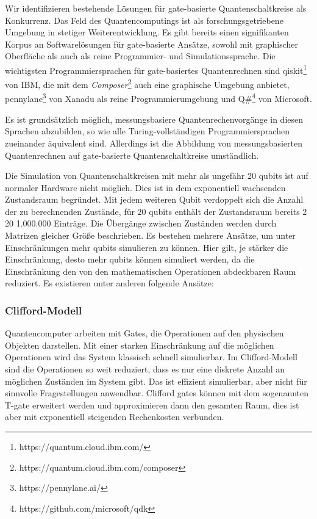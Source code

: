 \documentclass[11pt, a4paper]{article}
\newcommand{\instruction}[1]{{}}
\begin{document}
\instruction{quantitative Gegenüberstellung konkurrierender Lösungen}

\instruction{bisherige Arbeiten der Partner mit Bezug zu den Zielen
  dieses Vorhabens}

\instruction{Beschreibung bestehender und konkurrierender
  Technologien. Benennung eines konkreten Anwendungsfalls, bei dem
  aktuelle Technik an Grenzen stößt.}

Wir identifizieren bestehende Lösungen für gate-basierte
Quantenschaltkreise als Konkurrenz. Das Feld des Quantencomputings ist
als forschungsgetriebene Umgebung in stetiger Weiterentwicklung. Es
gibt bereits einen signifikanten Korpus an Softwarelösungen für
gate-basierte Ansätze, sowohl mit graphischer Oberfläche als auch als
reine Programmier- und Simulationssprache. Die wichtigsten
Programmiersprachen für gate-basiertes Quantenrechnen sind
qiskit\footnote{https://quantum.cloud.ibm.com/} von IBM, die mit dem
\emph{Composer}\footnote{https://quantum.cloud.ibm.com/composer} auch
eine graphische Umgebung anbietet,
pennylane\footnote{https://pennylane.ai/} von Xanadu als reine
Programmierumgebung und Q\#\footnote{https://github.com/microsoft/qdk}
von Microsoft.

Es ist grundsätzlich möglich, messungsbasiere Quantenrechenvorgänge in
diesen Sprachen abzubilden, so wie alle Turing-vollständigen
Programmiersprachen zueinander äquivalent sind. Allerdings ist die
Abbildung von messungsbasierten Quantenrechnen auf gate-basierte
Quantenschaltkreise umständlich.

Die Simulation von Quantenschaltkreisen mit mehr als ungefähr 20
qubits ist auf normaler Hardware nicht möglich. Dies ist in dem
exponentiell wachsenden Zustandsraum begründet. Mit jedem weiteren
Qubit verdoppelt sich die Anzahl der zu berechnenden Zustände, für 20
qubits enthält der Zustandsraum bereits 2 20 1.000.000 Einträge. Die
Übergänge zwischen Zuständen werden durch Matrizen gleicher Größe
beschrieben. Es bestehen mehrere Ansätze, um unter Einschränkungen
mehr qubits simulieren zu können. Hier gilt, je stärker die
Einschränkung, desto mehr qubits können simuliert werden, da die
Einschränkung den von den mathematischen Operationen abdeckbaren Raum
reduziert. Es existieren unter anderen folgende Ansätze:

\subsubsection{Clifford-Modell}

Quantencomputer arbeiten mit Gates, die Operationen auf den physischen
Objekten darstellen. Mit einer starken Einschränkung auf die möglichen
Operationen wird das System klassisch schnell simulierbar. Im
Clifford-Modell sind die Operationen so weit reduziert, dass es nur
eine diskrete Anzahl an möglichen Zuständen im System gibt. Das ist
effizient simulierbar, aber nicht für sinnvolle Fragestellungen
anwendbar. Clifford gates können mit dem sogenannten T-gate erweitert
werden und approximieren dann den gesamten Raum, dies ist aber mit
exponentiell steigenden Rechenkosten verbunden.
\end{document}
